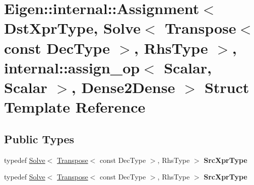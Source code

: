 \hypertarget{struct_eigen_1_1internal_1_1_assignment_3_01_dst_xpr_type_00_01_solve_3_01_transpose_3_01const_002733ef61eadb9652bc6bc1dd0938391}{}\section{Eigen\+:\+:internal\+:\+:Assignment$<$ Dst\+Xpr\+Type, Solve$<$ Transpose$<$ const Dec\+Type $>$, Rhs\+Type $>$, internal\+:\+:assign\+\_\+op$<$ Scalar, Scalar $>$, Dense2\+Dense $>$ Struct Template Reference}
\label{struct_eigen_1_1internal_1_1_assignment_3_01_dst_xpr_type_00_01_solve_3_01_transpose_3_01const_002733ef61eadb9652bc6bc1dd0938391}
\subsection*{Public Types}
\begin{DoxyCompactItemize}
\item 
\mbox{\label{struct_eigen_1_1internal_1_1_assignment_3_01_dst_xpr_type_00_01_solve_3_01_transpose_3_01const_002733ef61eadb9652bc6bc1dd0938391_a5db89fee454b66d40d062899472d0234}} 
typedef \hyperlink{group___core___module_class_eigen_1_1_solve}{Solve}$<$ \hyperlink{group___core___module_class_eigen_1_1_transpose}{Transpose}$<$ const Dec\+Type $>$, Rhs\+Type $>$ {\bfseries Src\+Xpr\+Type}
\item 
\mbox{\label{struct_eigen_1_1internal_1_1_assignment_3_01_dst_xpr_type_00_01_solve_3_01_transpose_3_01const_002733ef61eadb9652bc6bc1dd0938391_a5db89fee454b66d40d062899472d0234}} 
typedef \hyperlink{group___core___module_class_eigen_1_1_solve}{Solve}$<$ \hyperlink{group___core___module_class_eigen_1_1_transpose}{Transpose}$<$ const Dec\+Type $>$, Rhs\+Type $>$ {\bfseries Src\+Xpr\+Type}
\end{DoxyCompactItemize}
